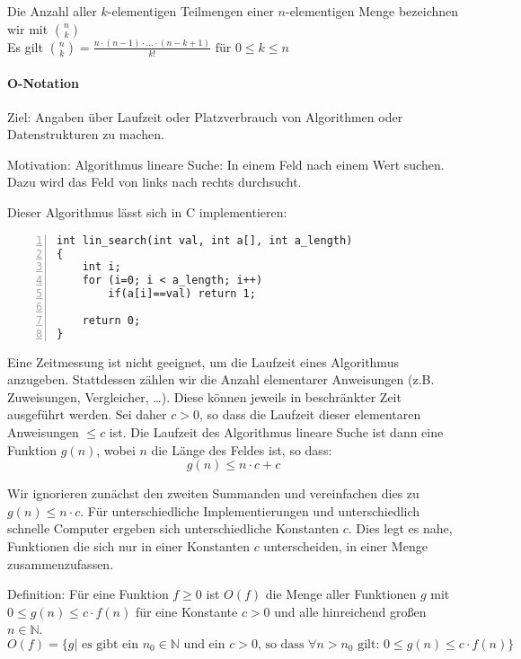 \documentclass[a4paper]{scrartcl}
\begin{document}
Die Anzahl aller $k$-elementigen Teilmengen einer $n$-elementigen Menge bezeichnen wir mit $\binom{n}{k}$\\
Es gilt $\binom{n}{k} = \frac{n\cdot (n-1) \cdot ... \cdot (n-k+1)}{k!}$
${\text{für } 0 \leq k \leq n}$

\paragraph{O-Notation}
Ziel: Angaben über Laufzeit oder Platzverbrauch von Algorithmen oder Datenstrukturen zu machen.

Motivation: Algorithmus lineare Suche:
In einem Feld nach einem Wert suchen. Dazu wird das Feld von links nach rechts durchsucht.

Dieser Algorithmus lässt sich in C implementieren:

\begin{lstlisting}[numbers=left, tabsize=4, style=customc]
int lin_search(int val, int a[], int a_length)
{
    int i;
    for (i=0; i < a_length; i++)
        if(a[i]==val) return 1;
    
    return 0;
}

\end{lstlisting}

Eine Zeitmessung ist nicht geeignet, um die Laufzeit eines Algorithmus anzugeben. Stattdessen zählen wir die Anzahl elementarer Anweisungen (z.B. Zuweisungen, Vergleicher, \dots). Diese können jeweils in beschränkter Zeit ausgeführt werden. Sei daher $c>0$, so dass die Laufzeit dieser elementaren Anweisungen $\leq c$ ist. Die Laufzeit des Algorithmus lineare Suche ist dann eine Funktion $g(n)$, wobei $n$ die Länge des Feldes ist, so dass: \[g(n) \leq n \cdot c + c\]

Wir ignorieren zunächst den zweiten Summanden und vereinfachen dies zu $g(n) \leq n \cdot c$. Für unterschiedliche Implementierungen und unterschiedlich schnelle Computer ergeben sich unterschiedliche Konstanten $c$. Dies legt es nahe, Funktionen die sich nur in einer Konstanten $c$ unterscheiden, in einer Menge zusammenzufassen.

Definition: Für eine Funktion $f \geq 0$ ist $O(f)$ die Menge aller Funktionen $g$ mit $0 \leq g(n) \leq c \cdot f(n)$ für eine Konstante $c > 0$ und alle hinreichend großen $n \in \mathbb{N}$.
\[O(f) = \{ g | \text{ es gibt ein } n_0 \in \mathbb{N} \text{ und ein } c >0  \text{, so dass } \forall n > n_0 \text{ gilt: } 0 \leq g(n) \leq c \cdot f(n)\} \]
\end{document}
